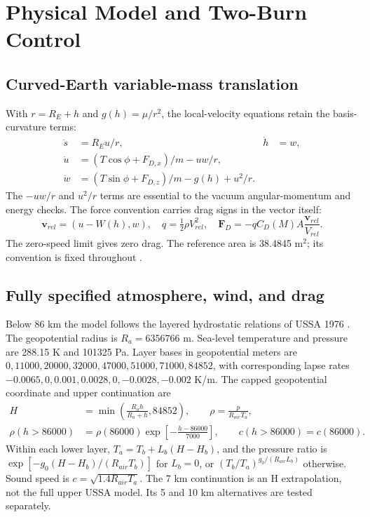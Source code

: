\documentclass[11pt,a4paper]{article}
\newcommand{\vct}[1]{\bm{#1}}
\begin{document}
\section{Physical Model and Two-Burn Control}
\subsection{Curved-Earth variable-mass translation}
With $r=R_E+h$ and $g(h)=\mu/r^2$, the local-velocity equations retain the basis-curvature terms:
\begin{equation}\begin{aligned}
\dot s&=R_Eu/r,&\dot h&=w,\\
\dot u&=(T\cos\phi+F_{D,x})/m-uw/r,\\
\dot w&=(T\sin\phi+F_{D,z})/m-g(h)+u^2/r.
\end{aligned}\label{eq:motion}\end{equation}
The $-uw/r$ and $u^2/r$ terms are essential to the vacuum angular-momentum and energy checks. The force convention carries drag signs in the vector itself:
\begin{equation}
\vct v_{rel}=(u-W(h),w),\quad q=\tfrac12\rho V_{rel}^2,\quad
\vct F_D=-qC_D(M)A\frac{\vct v_{rel}}{V_{rel}}.
\label{eq:drag}\end{equation}
The zero-speed limit gives zero drag. The reference area is 38.4845 m$^2$; its convention is fixed throughout \cite{drag}.

\subsection{Fully specified atmosphere, wind, and drag}
Below 86 km the model follows the layered hydrostatic relations of USSA 1976 \cite{ussa}. The geopotential radius is $R_a=6356766$ m. Sea-level temperature and pressure are 288.15 K and 101325 Pa. Layer bases in geopotential meters are $0,11000,20000,32000,47000,51000,71000,84852$, with corresponding lapse rates $-0.0065,0,0.001,0.0028,0,-0.0028,-0.002$ K/m. The capped geopotential coordinate and upper continuation are
\begin{equation}\begin{aligned}
H&=\min\!\left(\frac{R_ah}{R_a+h},84852\right),\qquad
\rho=\frac{p}{R_{air}T_a},\\
\rho(h>86000)&=\rho(86000)\exp\!\left[-\frac{h-86000}{7000}\right],\qquad
c(h>86000)=c(86000).
\end{aligned}\label{eq:atmosphere}\end{equation}
Within each lower layer, $T_a=T_b+L_b(H-H_b)$, and the pressure ratio is $\exp[-g_0(H-H_b)/(R_{air}T_b)]$ for $L_b=0$, or $(T_b/T_a)^{g_0/(R_{air}L_b)}$ otherwise. Sound speed is $c=\sqrt{1.4R_{air}T_a}$. The 7 km continuation is an H extrapolation, not the full upper USSA model. Its 5 and 10 km alternatives are tested separately.
\end{document}
